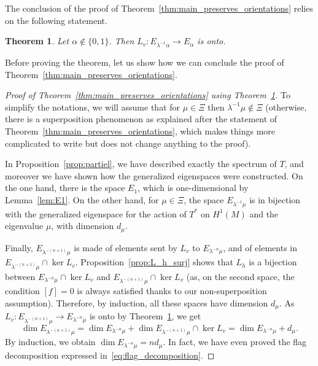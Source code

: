 \documentclass[11pt, a4paper, oneside, final, pagebackref]{amsart}
\newtheorem{thm}{Theorem}[section]
\theoremstyle{definition}
\numberwithin{equation}{section}
\begin{document}
The conclusion of the proof of Theorem~\ref{thm:main_preserves_orientations}
relies on the following statement.
\begin{thm}
\label{thm:Lv_integre} Let $\alpha \notin  \{0,1\}$. Then $L_v :
E_{\lambda^{-1}\alpha} \to E_\alpha$ is onto.
\end{thm}
Before proving the theorem, let us show how we can conclude the proof of
Theorem~\ref{thm:main_preserves_orientations}.

\begin{proof}[Proof of Theorem~\ref{thm:main_preserves_orientations} using
Theorem~\ref{thm:Lv_integre}] To simplify the notations, we will assume that
for $\mu \in \Xi$ then $\lambda^{-1} \mu \notin \Xi$ (otherwise, there is a
superposition phenomenon as explained after the statement of
Theorem~\ref{thm:main_preserves_orientations}, which makes things more
complicated to write but does not change anything to the proof).

In Proposition~\ref{prop:partiel}, we have described exactly the spectrum of
$T$, and moreover we have shown how the generalized eigenspaces were
constructed. On the one hand, there is the space $E_1$, which is
one-dimensional by Lemma~\ref{lem:E1}. On the other hand, for $\mu \in \Xi$,
the space $E_{\lambda^{-1}\mu}$ is in bijection with the generalized
eigenspace for the action of $T^*$ on $H^1(M)$ and the eigenvalue $\mu$, with
dimension $d_\mu$.

Finally, $E_{\lambda^{-(n+1)} \mu}$ is made of elements sent by $L_v$ to
$E_{\lambda^{-n} \mu}$, and of elements in $E_{\lambda^{-(n+1)} \mu} \cap
\ker L_v$. Proposition~\ref{prop:L_h_surj} shows that $L_h$ is a bijection
between $E_{\lambda^{-n} \mu} \cap \ker L_v$ and $E_{\lambda^{-(n+1)} \mu}
\cap \ker L_v$ (as, on the second space, the condition $[f] = 0$ is always
satisfied thanks to our non-superposition assumption). Therefore, by
induction, all these spaces have dimension $d_\mu$. As $L_v :
E_{\lambda^{-(n+1)} \mu} \to E_{\lambda^{-n} \mu}$ is onto by
Theorem~\ref{thm:Lv_integre}, we get
\begin{equation*}
  \dim E_{\lambda^{-(n+1)} \mu} =
  \dim E_{\lambda^{-n} \mu} + \dim E_{\lambda^{-(n+1)} \mu} \cap \ker L_v
  = \dim E_{\lambda^{-n} \mu} + d_\mu.
\end{equation*}
By induction, we obtain $\dim E_{\lambda^{-n} \mu} = n d_\mu$. In fact, we
have even proved the flag decomposition expressed
in~\eqref{eq:flag_decomposition}.
\end{proof}
\end{document}
